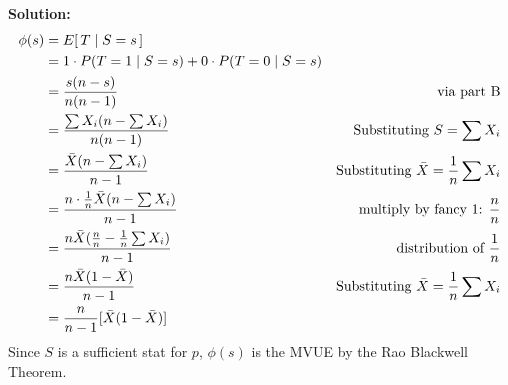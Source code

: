 \begin{enumerate}[label=({\alph*})]
    \nnl \textbf{Solution: } 
    \begin{align*}
        \phi(s) &= E[\,T \mid S = s\,] &\\ &= 1 \cdot P(T = 1 \mid S = s) + 0 \cdot P(T = 0 \mid S = s) &\\
        &= \frac{s(n-s)}{n(n-1)} & \text{via part B}\\
        &= \frac{\sum X_i (n-\sum X_i)}{n(n-1)} & \text{Substituting } S = \sum X_i\\
        &= \frac{\bar{X} (n-\sum X_i)}{n-1} & \text{Substituting } \bar{X} = \frac{1}{{n}} \sum X_i \\
        &= \frac{n \cdot \frac{1}{{n}} \bar{X} (n-\sum X_i)}{n-1} & \text{multiply by fancy 1: } \frac{n}{n}\\
        &= \frac{n \bar{X} (\frac{n}{n}- \frac{1}{{n}}\sum X_i)}{n-1} & \text{distribution of } \frac{1}{{n}}\\\
        &= \frac{n \bar{X} (1 - \bar{X})}{n-1} & \text{Substituting } \bar{X} = \frac{1}{{n}} \sum X_i \\
        &= \frac{n}{n-1}[\bar{X}(1-\bar{X})]
    \end{align*}
    Since $S$ is a sufficient stat for $p$, $\phi(s)$ is the MVUE by the Rao Blackwell Theorem.\vspace{.2in}
\end{enumerate}
